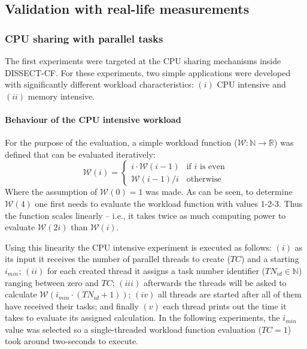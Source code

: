 \documentclass[sort, compress, 5p]{elsarticle}
\begin{document}
\subsection{Validation with real-life measurements}

\subsubsection{CPU sharing with parallel tasks}\label{SEC-CPUSHARE}


The first experiments were targeted at the CPU sharing mechanisms inside DISSECT-CF. For these experiments, two simple applications were developed with significantly different workload characteristics: $(i)$ CPU intensive and $(ii)$ memory intensive.

\paragraph{Behaviour of the CPU intensive workload} 
For the purpose of the evaluation, a simple workload function ($\mathcal{W}: \mathbb{N} \to \mathbb{R}$) was defined that can be evaluated iteratively:
\begin{equation} \label{EQ-Workload}
\mathcal{W}(i)=\left\{\begin{array}{ll}
i\cdot\mathcal{W}(i-1) & \textrm{if }i\textrm{ is even}\\
\mathcal{W}(i-1)/i & \textrm{otherwise}
\end{array}\right.
\end{equation}
Where the assumption of $\mathcal{W}(0)=1$ was made. As can be seen, to determine $\mathcal{W}(4)$ one first needs to evaluate the workload function with values 1-2-3. Thus the function scales linearly -- i.e., it takes twice as much computing power to evaluate $\mathcal{W}(2i)$ than $\mathcal{W}(i)$.

Using this linearity the CPU intensive experiment is executed as follows: $(i)$ as its input it receives the number of parallel threads to create ($TC$) and a starting $i_{min}$; $(ii)$ for each created thread it assigns a task number identifier ($TN_{id} \in \mathbb{N}$) ranging between zero and $TC$; $(iii)$ afterwards the threads will be asked to calculate $\mathcal{W}(i_{min}\cdot(TN_{id}+1))$; $(iv)$ all threads are started after all of them have received their tasks; and finally $(v)$ each thread prints out the time it takes to evaluate its assigned calculation. In the following experiments, the $i_{min}$ value was selected so a single-threaded workload function evaluation ($TC=1$) took around two-seconds to execute.
\end{document}
